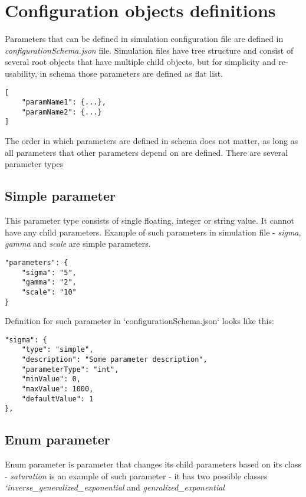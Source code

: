 \chapter{Configuration objects definitions}
Parameters that can be defined in simulation configuration file are defined in \textit{configurationSchema.json} file. Simulation files have tree structure and consist of several root objects that have multiple child objects, but for simplicity and re-usability, in schema those parameters are defined as flat list.

\begin{lstlisting}[label=list:param-def,caption=Parameter definitions in schema, basicstyle=\footnotesize\ttfamily]
[
    "paramName1": {...},
    "paramName2": {...}
]
\end{lstlisting}

The order in which parameters are defined in schema does not matter, as long as all parameters that other parameters depend on are defined. There are several parameter types
\section{Simple parameter}
This parameter type consists of single floating, integer or string value. It cannot have any child parameters. Example of such parameters in simulation file - \textit{sigma}, \textit{gamma} and \textit{scale} are simple parameters.
\begin{lstlisting}[label=list:simple-param,caption=Simple parameter definition, basicstyle=\footnotesize\ttfamily]
"parameters": {
    "sigma": "5",
    "gamma": "2",
    "scale": "10"
}
\end{lstlisting}
Definition for such parameter in `configurationSchema.json` looks like this:
\begin{lstlisting}[label=list:simple-param-def,caption=Simple parameter definition, basicstyle=\footnotesize\ttfamily]
"sigma": {
    "type": "simple",
    "description": "Some parameter description",
    "parameterType": "int",
    "minValue": 0,
    "maxValue": 1000,
    "defaultValue": 1
},
\end{lstlisting}

\section{Enum parameter}
Enum parameter is parameter that changes its child parameters based on its class - \textit{saturation} is an example of such parameter - it has two possible classes \textit{`inverse\_generalized\_exponential} and \textit{genralized\_exponential}

